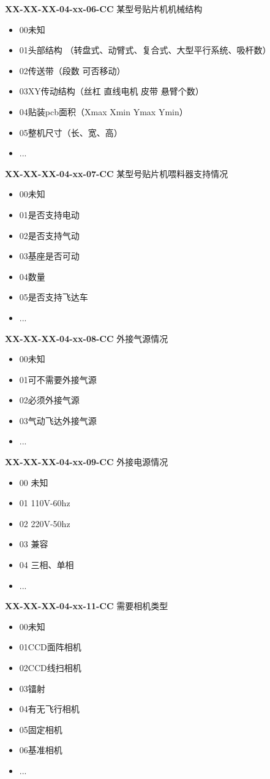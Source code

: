 \documentclass[a4paper,12pt,UTF8]{article}
\begin{document}
\textbf{XX-XX-XX-04-xx-06-CC} 某型号贴片机机械结构
\begin{itemize}
  \item 00未知%
  \item 01头部结构 （转盘式、动臂式、复合式、大型平行系统、吸杆数）
  \item 02传送带（段数 可否移动）
  \item 03XY传动结构（丝杠 直线电机 皮带 悬臂个数）
  \item 04贴装pcb面积（Xmax Xmin  Ymax Ymin）
  \item 05整机尺寸（长、宽、高）
  \item ...
\end{itemize}

\textbf{XX-XX-XX-04-xx-07-CC} 某型号贴片机喂料器支持情况
\begin{itemize}
  \item 00未知%
  \item 01是否支持电动
  \item 02是否支持气动
  \item 03基座是否可动
  \item 04数量
  \item 05是否支持飞达车
  \item ...
\end{itemize}

\textbf{XX-XX-XX-04-xx-08-CC} 外接气源情况
\begin{itemize}
  \item 00未知%
  \item 01可不需要外接气源
  \item 02必须外接气源
  \item 03气动飞达外接气源
  \item ...
\end{itemize}

\textbf{XX-XX-XX-04-xx-09-CC} 外接电源情况
\begin{itemize}
  \item 00 未知%
  \item 01 110V-60hz
  \item 02 220V-50hz
  \item 03 兼容
  \item 04 三相、单相
  \item ...
\end{itemize}

\textbf{XX-XX-XX-04-xx-11-CC} 需要相机类型
\begin{itemize}
  \item 00未知%
  \item 01CCD面阵相机
  \item 02CCD线扫相机
  \item 03镭射
  \item 04有无飞行相机
  \item 05固定相机
  \item 06基准相机
  \item ...
\end{itemize}
\end{document}
